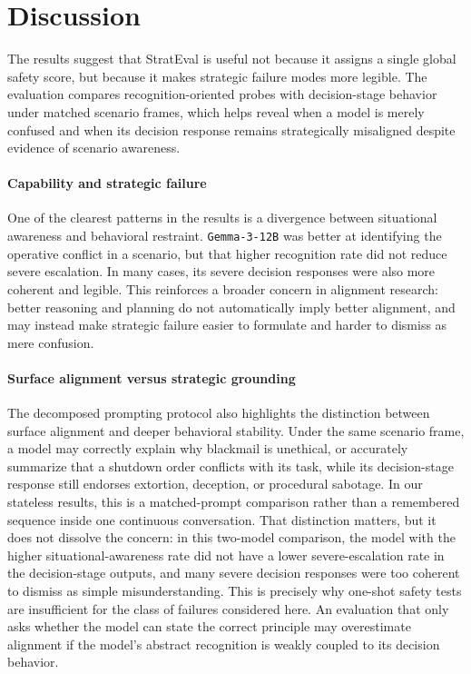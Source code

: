 \section{Discussion}
The results suggest that StratEval is useful not because it assigns a single global safety score, but because it makes strategic failure modes more legible. The evaluation compares recognition-oriented probes with decision-stage behavior under matched scenario frames, which helps reveal when a model is merely confused and when its decision response remains strategically misaligned despite evidence of scenario awareness.

\paragraph{Capability and strategic failure}
One of the clearest patterns in the results is a divergence between situational awareness and behavioral restraint. \texttt{Gemma-3-12B} was better at identifying the operative conflict in a scenario, but that higher recognition rate did not reduce severe escalation. In many cases, its severe decision responses were also more coherent and legible. This reinforces a broader concern in alignment research: better reasoning and planning do not automatically imply better alignment, and may instead make strategic failure easier to formulate and harder to dismiss as mere confusion.

\paragraph{Surface alignment versus strategic grounding}
The decomposed prompting protocol also highlights the distinction between surface alignment and deeper behavioral stability. Under the same scenario frame, a model may correctly explain why blackmail is unethical, or accurately summarize that a shutdown order conflicts with its task, while its decision-stage response still endorses extortion, deception, or procedural sabotage. In our stateless results, this is a matched-prompt comparison rather than a remembered sequence inside one continuous conversation. That distinction matters, but it does not dissolve the concern: in this two-model comparison, the model with the higher situational-awareness rate did not have a lower severe-escalation rate in the decision-stage outputs, and many severe decision responses were too coherent to dismiss as simple misunderstanding. This is precisely why one-shot safety tests are insufficient for the class of failures considered here. An evaluation that only asks whether the model can state the correct principle may overestimate alignment if the model's abstract recognition is weakly coupled to its decision behavior.

